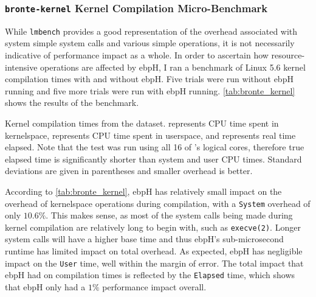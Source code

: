 \documentclass[
  12pt]{findlay}
\newcommand{\passthrough}[1]{#1}
\begin{document}
\FloatBarrier

\hypertarget{bronte-kernel-kernel-compilation-micro-benchmark}{%
\subsubsection{\texorpdfstring{\texttt{bronte-kernel} Kernel Compilation
Micro-Benchmark}{bronte-kernel Kernel Compilation Micro-Benchmark}}\label{bronte-kernel-kernel-compilation-micro-benchmark}}

\label{bronte_kernel}

While \passthrough{\lstinline!lmbench!} provides a good representation
of the overhead associated with system simple system calls and various
simple operations, it is not necessarily indicative of performance
impact as a whole. In order to ascertain how resource-intensive
operations are affected by ebpH, I ran a benchmark of Linux 5.6 kernel
compilation times with and without ebpH. Five trials were run without
ebpH running and five more trials were run with ebpH running.
\autoref{tab:bronte_kernel} shows the results of the benchmark.

\begin{table}
    \caption[Kernel compilation times from the  dataset]{
        Kernel compilation times from the  dataset.
         represents CPU time spent in kernelspace, 
        represents CPU time spent in userspace, and  represents real
        time elapsed. Note that the test was run using all 16 of 's logical cores,
        therefore true elapsed time is significantly shorter than system and user CPU times.
        Standard deviations are given in parentheses and smaller overhead is better.
    }
    \label{tab:bronte_kernel}
    
\end{table}

According to \autoref{tab:bronte_kernel}, ebpH has relatively small
impact on the overhead of kernelspace operations during compilation,
with a \passthrough{\lstinline!System!} overhead of only \(10.6\%\).
This makes sense, as most of the system calls being made during kernel
compilation are relatively long to begin with, such as
\passthrough{\lstinline!execve(2)!}. Longer system calls will have a
higher base time and thus ebpH's sub-microsecond runtime has limited
impact on total overhead. As expected, ebpH has negligible impact on the
\passthrough{\lstinline!User!} time, well within the margin of error.
The total impact that ebpH had on compilation times is reflected by the
\passthrough{\lstinline!Elapsed!} time, which shows that ebpH only had a
\(1\%\) performance impact overall.
\end{document}
